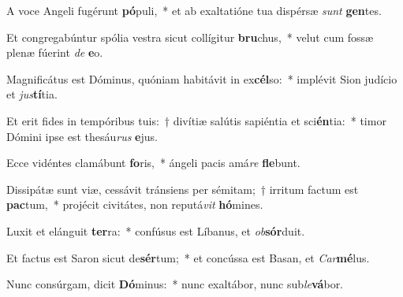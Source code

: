 \item A voce Angeli fugérunt \textbf{pó}puli,~* et ab exaltatióne tua dispérsæ \textit{sunt} \textbf{gen}tes.
\item Et congregabúntur spólia vestra sicut collígitur \textbf{bru}chus,~* velut cum fossæ plenæ fúerint \textit{de} \textbf{e}o.
\item Magnificátus est Dóminus, quóniam habitávit in ex\textbf{cél}so:~* implévit Sion judício et \textit{jus}\textbf{tí}tia.
\item Et erit fides in tempóribus tuis:~† divítiæ salútis sapiéntia et sci\textbf{én}tia:~* timor Dómini ipse est thesáu\textit{rus} \textbf{e}jus.
\item Ecce vidéntes clamábunt \textbf{fo}ris,~* ángeli pacis amá\textit{re} \textbf{fle}bunt.
\item Dissipátæ sunt viæ, cessávit tránsiens per sémitam;~† irritum factum est \textbf{pac}tum,~* projécit civitátes, non reputá\textit{vit} \textbf{hó}mines.
\item Luxit et elánguit \textbf{ter}ra:~* confúsus est Líbanus, et \textit{ob}\textbf{sór}duit.
\item Et factus est Saron sicut de\textbf{sér}tum;~* et concússa est Basan, et \textit{Car}\textbf{mé}lus.
\item Nunc consúrgam, dicit \textbf{Dó}minus:~* nunc exaltábor, nunc sub\textit{le}\textbf{vá}bor.
